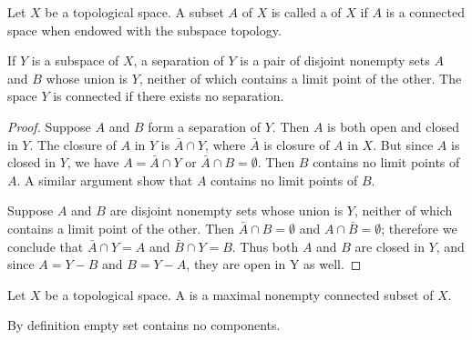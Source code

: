 \documentclass[11pt,a4paper]{article}
\begin{document}
\begin{definition}
Let $X$ be a topological space. A subset $A$ of $X$ is called a  of ${X}$ if $A$ is a connected space when endowed with the subspace topology.
\end{definition}

\begin{proposition}
If $Y$ is a subspace of $X$, a separation of $Y$ is a pair of disjoint nonempty sets $A$ and $B$ whose union is $Y$, neither of which contains a limit point of the other. The space $Y$ is connected if there exists no separation. 
\end{proposition}

\begin{proof}
\forward Suppose $A$ and $B$ form a separation of $Y$. Then $A$ is both open and closed in $Y$. The closure of $A$ in $Y$ is $\bar{A}\cap Y$, where $\bar{A}$ is closure of $A$ in $X$. But since $A$ is closed in $Y$, we have $A = \bar{A}\cap Y$ or $\bar{A}\cap B=\emptyset$. Then $B$ contains no limit points of $A$. A similar argument show that $A$ contains no limit points of $B$.

\noindent\converse Suppose $A$ and $B$ are disjoint nonempty sets whose union is $Y$, neither of which contains a limit point of the other. Then $\bar{A}\cap B = \emptyset$ and $A\cap \bar{B} = \emptyset$; therefore we conclude that $\bar{A}\cap Y = A$ and $\bar{B}\cap Y = B$. Thus both $A$ and $B$ are closed in $Y$, and since $A = Y - B$ and $B = Y - A$, they are open in Y as well.
\end{proof}

\begin{definition}
Let $X$ be a topological space. A  is a maximal nonempty connected subset of $X$.
\end{definition}

\begin{remark}
By definition empty set contains no components.
\end{remark}
\end{document}
